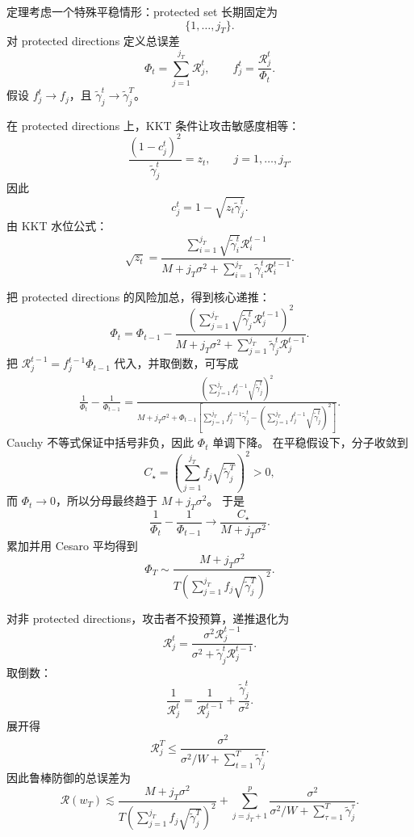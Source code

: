 \documentclass[UTF8,fontset=none,11pt]{ctexart}
\theoremstyle{cnstyle}
\newcommand{\calR}{\mathcal{R}}
\begin{document}
定理考虑一个特殊平稳情形：protected set 长期固定为
\[
  \{1,\dots,j_T\}.
\]
对 protected directions 定义总误差
\[
  \Phi_t=\sum_{j=1}^{j_T}\calR_j^t,
  \qquad
  f_j^t=\frac{\calR_j^t}{\Phi_t}.
\]
假设 \(f_j^t\to f_j\)，且 \(\tilde\gamma_j^t\to\tilde\gamma_j^T\)。

在 protected directions 上，KKT 条件让攻击敏感度相等：
\[
  \frac{(1-c_j^t)^2}{\tilde\gamma_j^t}=z_t,
  \qquad j=1,\dots,j_T.
\]
因此
\[
  c_j^t=1-\sqrt{z_t\tilde\gamma_j^t}.
\]
由 KKT 水位公式：
\[
  \sqrt{z_t}
  =
  \frac{
  \sum_{i=1}^{j_T}\sqrt{\tilde\gamma_i^t}\calR_i^{t-1}
  }{
  M+j_T\sigma^2+\sum_{i=1}^{j_T}\tilde\gamma_i^t\calR_i^{t-1}
  } .
\]

把 protected directions 的风险加总，得到核心递推：
\begin{equation}
  \Phi_t
  =
  \Phi_{t-1}
  -
  \frac{
  \left(
  \sum_{j=1}^{j_T}\sqrt{\tilde\gamma_j^t}\calR_j^{t-1}
  \right)^2
  }{
  M+j_T\sigma^2+
  \sum_{j=1}^{j_T}\tilde\gamma_j^t\calR_j^{t-1}
  } .
  \label{eq:phi-recursion}
\end{equation}
把 \(\calR_j^{t-1}=f_j^{t-1}\Phi_{t-1}\) 代入，并取倒数，可写成
\begin{align}
  \frac{1}{\Phi_t}-\frac{1}{\Phi_{t-1}}
  =
  \frac{
  \left(
  \sum_{j=1}^{j_T}f_j^{t-1}\sqrt{\tilde\gamma_j^t}
  \right)^2
  }{
  M+j_T\sigma^2+
  \Phi_{t-1}
  \left[
  \sum_{j=1}^{j_T}f_j^{t-1}\tilde\gamma_j^t
  -
  \left(
  \sum_{j=1}^{j_T}f_j^{t-1}\sqrt{\tilde\gamma_j^t}
  \right)^2
  \right]
  }.
  \label{eq:phi-reciprocal}
\end{align}
Cauchy 不等式保证中括号非负，因此 \(\Phi_t\) 单调下降。
在平稳假设下，分子收敛到
\[
  C_\star=
  \left(
  \sum_{j=1}^{j_T}f_j\sqrt{\tilde\gamma_j^T}
  \right)^2>0,
\]
而 \(\Phi_t\to0\)，所以分母最终趋于 \(M+j_T\sigma^2\)。
于是
\[
  \frac{1}{\Phi_t}-\frac{1}{\Phi_{t-1}}
  \to
  \frac{C_\star}{M+j_T\sigma^2}.
\]
累加并用 Cesaro 平均得到
\[
  \Phi_T
  \sim
  \frac{M+j_T\sigma^2}
  {T\left(\sum_{j=1}^{j_T}f_j\sqrt{\tilde\gamma_j^T}\right)^2}.
\]

对非 protected directions，攻击者不投预算，递推退化为
\[
  \calR_j^t
  =
  \frac{\sigma^2\calR_j^{t-1}}
  {\sigma^2+\tilde\gamma_j^t\calR_j^{t-1}}.
\]
取倒数：
\[
  \frac{1}{\calR_j^t}
  =
  \frac{1}{\calR_j^{t-1}}
  +\frac{\tilde\gamma_j^t}{\sigma^2}.
\]
展开得
\[
  \calR_j^T
  \le
  \frac{\sigma^2}
  {\sigma^2/W+\sum_{t=1}^T\tilde\gamma_j^t}.
\]
因此鲁棒防御的总误差为
\begin{equation}
  \calR(w_T)
  \lesssim
  \frac{M+j_T\sigma^2}
  {T\left(\sum_{j=1}^{j_T}f_j\sqrt{\tilde\gamma_j^T}\right)^2}
  +
  \sum_{j=j_T+1}^p
  \frac{\sigma^2}
  {\sigma^2/W+\sum_{\tau=1}^T\tilde\gamma_j^\tau}.
  \label{eq:rfd-final}
\end{equation}
\end{document}
